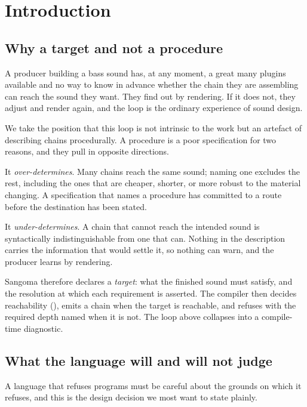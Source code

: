\documentclass[11pt,twocolumn,a4paper]{article}
\theoremstyle{definition}
\theoremstyle{remark}
\begin{document}
\section{Introduction}
\label{sec:intro}

\subsection{Why a target and not a procedure}

A producer building a bass sound has, at any moment, a great many plugins
available and no way to know in advance whether the chain they are assembling can
reach the sound they want. They find out by rendering. If it does not, they
adjust and render again, and the loop is the ordinary experience of sound design.

We take the position that this loop is not intrinsic to the work but an artefact
of describing chains procedurally. A procedure is a poor specification for two
reasons, and they pull in opposite directions.

It \emph{over-determines}. Many chains reach the same sound; naming one excludes
the rest, including the ones that are cheaper, shorter, or more robust to the
material changing. A specification that names a procedure has committed to a
route before the destination has been stated.

It \emph{under-determines}. A chain that cannot reach the intended sound is
syntactically indistinguishable from one that can. Nothing in the description
carries the information that would settle it, so nothing can warn, and the
producer learns by rendering.

Sangoma therefore declares a \emph{target}: what the finished sound must satisfy,
and the resolution at which each requirement is asserted. The compiler then
decides reachability (), emits a chain when the target is
reachable, and refuses with the required depth named when it is not. The loop
above collapses into a compile-time diagnostic.

\subsection{What the language will and will not judge}

A language that refuses programs must be careful about the grounds on which it
refuses, and this is the design decision we most want to state plainly.
\end{document}
